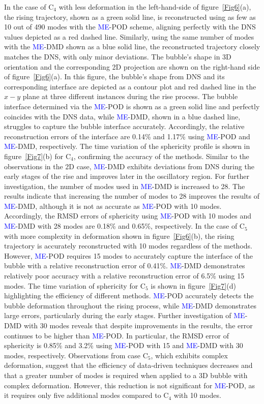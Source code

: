 \documentclass[a4paper,fleqn]{cas-sc}
\newcommand{\hl}[1]{\textcolor{blue}{#1}} %
\newcommand{\hl}[1]{#1} %
\begin{document}
	
	In the case of C$_4$ with less deformation in the left-hand-side of figure~\ref{Fig6}(a), the rising trajectory, shown as a green solid line, is reconstructed using as few as 10 out of 490 modes with the \hl{ME}-POD scheme, aligning perfectly with the DNS values depicted as a red dashed line. Similarly, using the same number of modes with the \hl{ME}-DMD shown as a blue solid line, the reconstructed trajectory closely matches the DNS, with only minor deviations. The bubble's shape in 3D orientation and the corresponding 2D projection are shown on the right-hand side of figure~\ref{Fig6}(a). In this figure, the bubble's shape from DNS and its corresponding interface are depicted as a contour plot and red dashed line in the $x-y$ plane at three different instances during the rise process. The bubble interface determined via the \hl{ME}-POD is shown as a green solid line and perfectly coincides with the DNS data, while \hl{ME}-DMD, shown in a blue dashed line, struggles to capture the bubble interface accurately. Accordingly, the relative reconstruction errors of the interface are 0.14\% and 1.17\% using \hl{ME}-POD and \hl{ME}-DMD, respectively. The time variation of the sphericity profile is shown in figure~\ref{Fig7}(b) for C$_4$, confirming the accuracy of the methods. Similar to the observations in the 2D case, \hl{ME}-DMD exhibits deviations from DNS during the early stages of the rise and improves later in the oscillatory region. For further investigation, the number of modes used in \hl{ME}-DMD is increased to 28. The results indicate that increasing the number of modes to 28 improves the results of \hl{ME}-DMD, although it is not as accurate as \hl{ME}-POD with 10 modes. Accordingly, the RMSD errors of sphericity using \hl{ME}-POD with 10 modes and \hl{ME}-DMD with 28 modes are 0.18\% and 0.65\%, respectively. In the case of C$_5$ with more complexity in deformation shown in figure~\ref{Fig6}(b), the rising trajectory is accurately reconstructed with 10 modes regardless of the methods. However, \hl{ME}-POD requires 15 modes to accurately capture the interface of the bubble with a relative reconstruction error of 0.41\%. \hl{ME}-DMD demonstrates relatively poor accuracy with a relative reconstruction error of 6.5\% using 15 modes. The time variation of sphericity for C$_5$ is shown in figure~\ref{Fig7}(d) highlighting the efficiency of different methods. \hl{ME}-POD accurately detects the bubble deformation throughout the rising process, while \hl{ME}-DMD demonstrates large errors, particularly during the early stages. Further investigation of \hl{ME}-DMD with 30 modes reveals that despite improvements in the results, the error continues to be higher than \hl{ME}-POD. In particular, the RMSD error of sphericity is 0.85\% and 3.2\% using \hl{ME}-POD with 15 and \hl{ME}-DMD with 30 modes, respectively. Observations from case C$_5$, which exhibits complex deformation, suggest that the efficiency of data-driven techniques decreases and that a greater number of modes is required when applied to a 3D bubble with complex deformation. However, this reduction is not significant for \hl{ME}-POD, as it requires only five additional modes compared to C$_4$ with 10 modes. 
	
\end{document}
